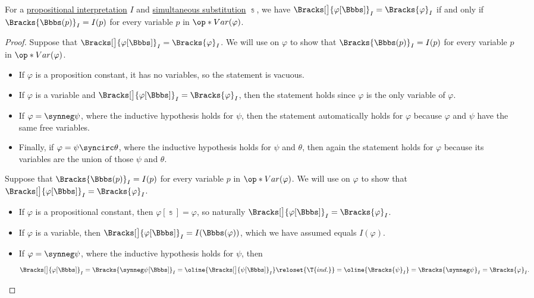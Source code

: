 \begin{proposition}\label{thm:propositional_substitution_equivalence}
  For a \hyperref[def:propositional_interpretation]{propositional interpretation} \( I \) and \hyperref[def:atomic_propositional_substitution]{simultaneous substitution} \( \Bbbs \), we have \( \Bracks[\big]{\varphi[\Bbbs]}_I = \Bracks{\varphi}_I \) if and only if \( \Bracks{\Bbbs(p)}_I = I(p) \) for every variable \( p \) in \( \op*{Var}(\varphi) \).
\end{proposition}
\begin{proof}
  \SufficiencySubProof Suppose that \( \Bracks[\big]{\varphi[\Bbbs]}_I = \Bracks{\varphi}_I\). We will use  on \( \varphi \) to show that \( \Bracks{\Bbbs(p)}_I = I(p) \) for every variable \( p \) in \( \op*{Var}(\varphi) \).

  \begin{itemize}
    \item If \( \varphi \) is a proposition constant, it has no variables, so the statement is vacuous.
    \item If \( \varphi \) is a variable and \( \Bracks[\big]{\varphi[\Bbbs]}_I = \Bracks{\varphi}_I \), then the statement holds since \( \varphi \) is the only variable of \( \varphi \).
    \item If \( \varphi = \synneg \psi \), where the inductive hypothesis holds for \( \psi \), then the statement automatically holds for \( \varphi \) because \( \varphi \) and \( \psi \) have the same free variables.
    \item Finally, if \( \varphi = \psi \syncirc \theta \), where the inductive hypothesis holds for \( \psi \) and \( \theta \), then again the statement holds for \( \varphi \) because its variables are the union of those \( \psi \) and \( \theta \).
  \end{itemize}

  \NecessitySubProof Suppose that \( \Bracks{\Bbbs(p)}_I = I(p) \) for every variable \( p \) in \( \op*{Var}(\varphi) \). We will use  on \( \varphi \) to show that \( \Bracks[\big]{\varphi[\Bbbs]}_I = \Bracks{\varphi}_I \).

  \begin{itemize}
    \item If \( \varphi \) is a propositional constant, then \( \varphi[\Bbbs] = \varphi \), so naturally \( \Bracks[\big]{\varphi[\Bbbs]}_I = \Bracks{\varphi}_I \).
    \item If \( \varphi \) is a variable, then \( \Bracks[\big]{\varphi[\Bbbs]}_I = I(\Bbbs(\varphi)) \), which we have assumed equals \( I(\varphi) \).
    \item If \( \varphi = \synneg \psi \), where the inductive hypothesis holds for \( \psi \), then
    \begin{equation*}
      \Bracks[\big]{\varphi[\Bbbs]}_I
      =
      \Bracks{\synneg \psi[\Bbbs]}_I
      =
      \oline{\Bracks[\big]{\psi[\Bbbs]}_I}
      \reloset {\T{ind.}} =
      \oline{\Bracks{\psi}_I}
      =
      \Bracks{\synneg \psi}_I
      =
      \Bracks{\varphi}_I.
    \end{equation*}


\end{itemize}
\end{proof}
